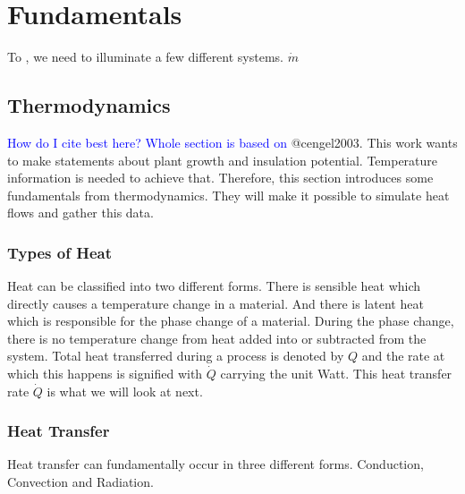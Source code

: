 \chapter{Fundamentals}
\label{chap:fundamentals}

To , we need to illuminate a few different systems.
$\dot{m}$

\section{Thermodynamics}
\textcolor{Blue}{How do I cite best here? Whole section is based on} @cengel2003.
This work wants to make statements about plant growth and insulation potential.
Temperature information is needed to achieve that.
Therefore, this section introduces some fundamentals from thermodynamics.
They will make it possible to simulate heat flows and gather this data.



\subsection{Types of Heat}
Heat can be classified into two different forms.
There is sensible heat which directly causes a temperature change in a material.
And there is latent heat which is responsible for the phase change of a material.
During the phase change, there is no temperature change from heat added into or subtracted from the system.
Total heat transferred during a process is denoted by $Q$ and the rate at which this happens is signified with $\dot{Q}$ carrying the unit Watt.
This heat transfer rate $\dot{Q}$ is what we will look at next.

\subsection{Heat Transfer}
Heat transfer can fundamentally occur in three different forms.
Conduction, Convection and Radiation.

